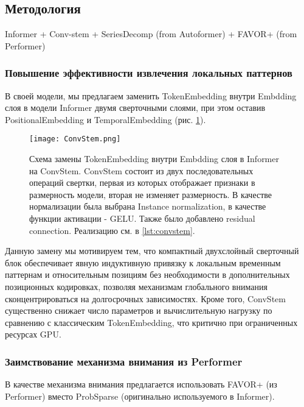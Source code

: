 \subsection{Методология}

{\color{red} Informer + Conv-stem + SeriesDecomp (from Autoformer) + FAVOR+ (from Performer)}

\subsubsection{Повышение эффективности извлечения локальных паттернов}

В своей модели, мы предлагаем заменить TokenEmbedding внутри Embdding слоя 
в модели Informer двумя сверточными слоями, при этом оставив PositionalEmbedding 
и TemporalEmbedding (рис. \ref{fig:convstem}).

\begin{figure}[h!]
    \centering
    \texttt{[image: ConvStem.png]}
    \caption{Схема замены TokenEmbedding внутри Embdding слоя в Informer на ConvStem. 
    ConvStem состоит из двух последовательных операций свертки, первая из которых 
    отображает признаки в размерность модели, вторая не изменяет размерность. В 
    качестве нормализации была выбрана Instance normalization, в качестве функции активации 
    - GELU. Также было добавлено residual connection. Реализацию см. в \ref{lst:convstem}.}
    \label{fig:convstem}
\end{figure}

Данную замену мы мотивируем тем, что компактный двухслойный сверточный блок 
обеспечивает явную индуктивную привязку к локальным временным паттернам и 
относительным позициям без необходимости в дополнительных позиционных кодировках, 
позволяя механизмам глобального внимания сконцентрироваться на долгосрочных зависимостях. 
Кроме того, ConvStem существенно снижает число параметров и вычислительную нагрузку 
по сравнению с классическим TokenEmbedding, что критично при ограниченных ресурсах GPU.

\subsubsection{Заимствование механизма внимания из Performer}

В качестве механизма внимания предлагается использовать FAVOR+ 
(из Performer) вместо ProbSparse (оригинально используемого в Informer).

